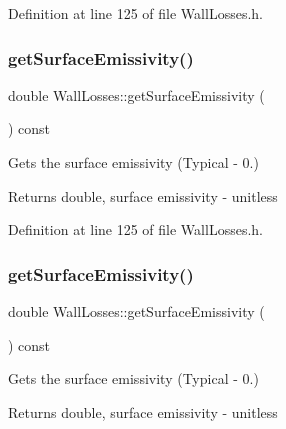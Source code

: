 Definition at line 125 of file Wall\+Losses.\+h.

\mbox{\label{class_wall_losses_ae1fce9523d14831ef6bc9b7823d5ea08}} 
\subsubsection{\texorpdfstring{get\+Surface\+Emissivity()}{getSurfaceEmissivity()}\hspace{0.1cm}{\footnotesize\ttfamily [2/3]}}
{\footnotesize\ttfamily double Wall\+Losses\+::get\+Surface\+Emissivity (\begin{DoxyParamCaption}{ }\end{DoxyParamCaption}) const\hspace{0.3cm}{\ttfamily [inline]}}

Gets the surface emissivity (Typical -\/ 0.) \begin{DoxyReturn}{Returns}
double, surface emissivity -\/ unitless 
\end{DoxyReturn}


Definition at line 125 of file Wall\+Losses.\+h.

\mbox{\label{class_wall_losses_ae1fce9523d14831ef6bc9b7823d5ea08}} 
\subsubsection{\texorpdfstring{get\+Surface\+Emissivity()}{getSurfaceEmissivity()}\hspace{0.1cm}{\footnotesize\ttfamily [3/3]}}
{\footnotesize\ttfamily double Wall\+Losses\+::get\+Surface\+Emissivity (\begin{DoxyParamCaption}{ }\end{DoxyParamCaption}) const\hspace{0.3cm}{\ttfamily [inline]}}

Gets the surface emissivity (Typical -\/ 0.) \begin{DoxyReturn}{Returns}
double, surface emissivity -\/ unitless 
\end{DoxyReturn}


